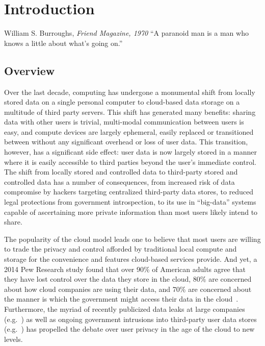 \chapter{Introduction}
\label{chap:intro}

\begin{chapquote}{William S. Burroughs, \textit{Friend Magazine, 1970}}
  ``A paranoid man is a man who knows a little about what's going on.''
\end{chapquote}

\section{Overview}
\label{chap:intro:overview}

Over the last decade, computing has undergone a monumental shift from
locally stored data on a single personal computer to cloud-based data
storage on a multitude of third party servers. This shift has
generated many benefits: sharing data with other users is trivial,
multi-modal communication between users is easy, and compute devices
are largely ephemeral, easily replaced or transitioned between without
any significant overhead or loss of user data. This transition,
however, has a significant side effect: user data is now largely
stored in a manner where it is easily accessible to third parties
beyond the user's immediate control. The shift from locally stored and
controlled data to third-party stored and controlled data has a number
of consequences, from increased risk of data compromise by hackers
targeting centralized third-party data stores, to reduced legal
protections from government introspection, to its use in ``big-data''
systems capable of ascertaining more private information than most
users likely intend to share.

The popularity of the cloud model leads one to believe that most users
are willing to trade the privacy and control afforded by traditional
local compute and storage for the convenience and features cloud-based
services provide. And yet, a 2014 Pew Research study found that over
90\% of American adults agree that they have lost control over the
data they store in the cloud, 80\% are concerned about how cloud
companies are using their data, and 70\% are concerned about the
manner is which the government might access their data in the
cloud~\cite{pew-privsec14}. Furthermore, the myriad of recently
publicized data leaks at large companies
(e.g.~\cite{apple-icloudleak}) as well as ongoing government
intrusions into third-party user data stores
(e.g.~\cite{greenwald-prism}) has propelled the debate over user
privacy in the age of the cloud to new levels.

